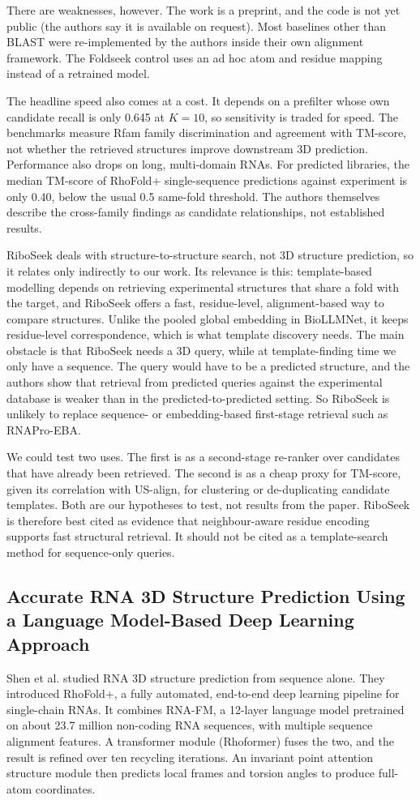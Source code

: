 \documentclass{FastFyp}
\begin{document}
There are weaknesses, however. The work is a preprint, and the code is not yet public (the authors say it is available on request). Most baselines other than BLAST were re-implemented by the authors inside their own alignment framework. The Foldseek control uses an ad hoc atom and residue mapping instead of a retrained model.

The headline speed also comes at a cost. It depends on a prefilter whose own candidate recall is only 0.645 at $K = 10$, so sensitivity is traded for speed. The benchmarks measure Rfam family discrimination and agreement with TM-score, not whether the retrieved structures improve downstream 3D prediction. Performance also drops on long, multi-domain RNAs. For predicted libraries, the median TM-score of RhoFold+ single-sequence predictions against experiment is only 0.40, below the usual 0.5 same-fold threshold. The authors themselves describe the cross-family findings as candidate relationships, not established results.

RiboSeek deals with structure-to-structure search, not 3D structure prediction, so it relates only indirectly to our work. Its relevance is this: template-based modelling depends on retrieving experimental structures that share a fold with the target, and RiboSeek offers a fast, residue-level, alignment-based way to compare structures. Unlike the pooled global embedding in BioLLMNet, it keeps residue-level correspondence, which is what template discovery needs. The main obstacle is that RiboSeek needs a 3D query, while at template-finding time we only have a sequence. The query would have to be a predicted structure, and the authors show that retrieval from predicted queries against the experimental database is weaker than in the predicted-to-predicted setting. So RiboSeek is unlikely to replace sequence- or embedding-based first-stage retrieval such as RNAPro-EBA.

We could test two uses. The first is as a second-stage re-ranker over candidates that have already been retrieved. The second is as a cheap proxy for TM-score, given its correlation with US-align, for clustering or de-duplicating candidate templates. Both are our hypotheses to test, not results from the paper. RiboSeek is therefore best cited as evidence that neighbour-aware residue encoding supports fast structural retrieval. It should not be cited as a template-search method for sequence-only queries.

\subsection{Accurate RNA 3D Structure Prediction Using a Language Model-Based Deep Learning Approach}\label{sec:rhofold}
Shen et al. \cite{ref:Shen:2024} studied RNA 3D structure prediction from sequence alone. They introduced RhoFold+, a fully automated, end-to-end deep learning pipeline for single-chain RNAs. It combines RNA-FM, a 12-layer language model pretrained on about 23.7 million non-coding RNA sequences, with multiple sequence alignment features. A transformer module (Rhoformer) fuses the two, and the result is refined over ten recycling iterations. An invariant point attention structure module then predicts local frames and torsion angles to produce full-atom coordinates.
\end{document}
